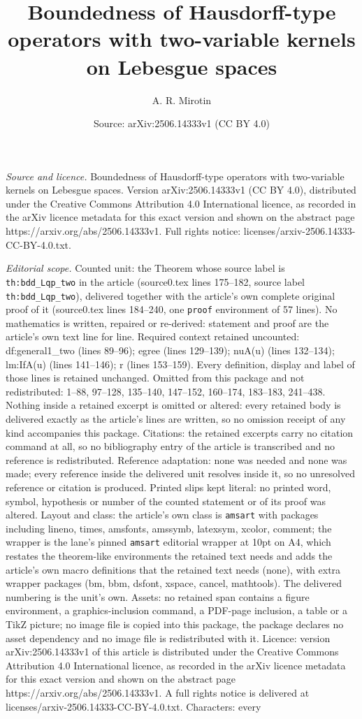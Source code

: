\documentclass[10pt,a4paper]{amsart}
\title[Boundedness of Hausdorff-type operators with two-variable ke]{Boundedness of Hausdorff-type operators with two-variable kernels on Lebesgue spaces}
\author{A. R. Mirotin}
\date{Source: arXiv:2506.14333v1 (CC BY 4.0)}
\begin{document}
\maketitle

\noindent\emph{Source and licence.} Boundedness of Hausdorff-type operators with two-variable kernels on Lebesgue spaces. Version arXiv:2506.14333v1 (CC BY 4.0), distributed under the Creative Commons Attribution 4.0 International licence, as recorded in the arXiv licence metadata for this exact version and shown on the abstract page https://arxiv.org/abs/2506.14333v1. Full rights notice: licenses/arxiv-2506.14333-CC-BY-4.0.txt.\par\smallskip

\noindent\textit{Editorial scope.} Counted unit: the Theorem whose source label is \texttt{th:bdd\_Lqp\_two} in the article (source0.tex lines 175--182, source label \texttt{th:bdd\_Lqp\_two}), delivered together with the article's own complete original proof of it (source0.tex lines 184--240, one \texttt{proof} environment of 57 lines). No mathematics is written, repaired or re-derived: statement and proof are the article's own text line for line. Required context retained uncounted: df:general1\_two (lines 89--96); egree (lines 129--139); nuA(u) (lines 132--134); lm:IfA(u) (lines 141--146); r (lines 153--159). Every definition, display and label of those lines is retained unchanged. Omitted from this package and not redistributed: 1--88, 97--128, 135--140, 147--152, 160--174, 183--183, 241--438. Nothing inside a retained excerpt is omitted or altered: every retained body is delivered exactly as the article's lines are written, so no omission receipt of any kind accompanies this package. Citations: the retained excerpts carry no citation command at all, so no bibliography entry of the article is transcribed and no reference is redistributed. Reference adaptation: none was needed and none was made; every reference inside the delivered unit resolves inside it, so no unresolved reference or citation is produced. Printed slips kept literal: no printed word, symbol, hypothesis or number of the counted statement or of its proof was altered. Layout and class: the article's own class is \texttt{amsart} with packages including lineno, times, amsfonts, amssymb, latexsym, xcolor, comment; the wrapper is the lane's pinned \texttt{amsart} editorial wrapper at 10pt on A4, which restates the theorem-like environments the retained text needs and adds the article's own macro definitions that the retained text needs (none), with extra wrapper packages (bm, bbm, dsfont, xspace, cancel, mathtools). The delivered numbering is the unit's own. Assets: no retained span contains a figure environment, a graphics-inclusion command, a PDF-page inclusion, a table or a TikZ picture; no image file is copied into this package, the package declares no asset dependency and no image file is redistributed with it. Licence: version arXiv:2506.14333v1 of this article is distributed under the Creative Commons Attribution 4.0 International licence, as recorded in the arXiv licence metadata for this exact version and shown on the abstract page https://arxiv.org/abs/2506.14333v1. A full rights notice is delivered at licenses/arxiv-2506.14333-CC-BY-4.0.txt. Characters: every 
\end{document}
